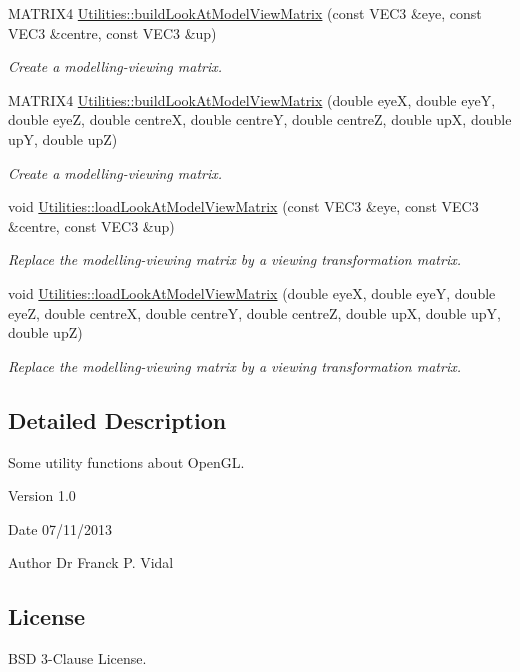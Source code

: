 \begin{DoxyCompactItemize}
\item 
MATRIX4 \hyperlink{namespace_utilities_a84ad75173a3da5e4e8b355d03d100c59}{Utilities::buildLookAtModelViewMatrix} (const VEC3 \&eye, const VEC3 \&centre, const VEC3 \&up)
\begin{DoxyCompactList}\small\item\em Create a modelling-\/viewing matrix. \end{DoxyCompactList}\item 
MATRIX4 \hyperlink{namespace_utilities_a0dfa7bb57b5c491451a43d8b4d7dd983}{Utilities::buildLookAtModelViewMatrix} (double eyeX, double eyeY, double eyeZ, double centreX, double centreY, double centreZ, double upX, double upY, double upZ)
\begin{DoxyCompactList}\small\item\em Create a modelling-\/viewing matrix. \end{DoxyCompactList}\item 
void \hyperlink{namespace_utilities_adcb191e43b838d267bd659167503a528}{Utilities::loadLookAtModelViewMatrix} (const VEC3 \&eye, const VEC3 \&centre, const VEC3 \&up)
\begin{DoxyCompactList}\small\item\em Replace the modelling-\/viewing matrix by a viewing transformation matrix. \end{DoxyCompactList}\item 
void \hyperlink{namespace_utilities_a8dfe8f9df9a5280d2b19e278b6c455eb}{Utilities::loadLookAtModelViewMatrix} (double eyeX, double eyeY, double eyeZ, double centreX, double centreY, double centreZ, double upX, double upY, double upZ)
\begin{DoxyCompactList}\small\item\em Replace the modelling-\/viewing matrix by a viewing transformation matrix. \end{DoxyCompactList}\end{DoxyCompactItemize}


\subsection{Detailed Description}
Some utility functions about OpenGL. \begin{DoxyVersion}{Version}
1.0
\end{DoxyVersion}
\begin{DoxyDate}{Date}
07/11/2013
\end{DoxyDate}
\begin{DoxyAuthor}{Author}
Dr Franck P. Vidal
\end{DoxyAuthor}
\hypertarget{_x_ray_renderer_8inl_License}{}\subsection{License}\label{_x_ray_renderer_8inl_License}
BSD 3-\/Clause License.

